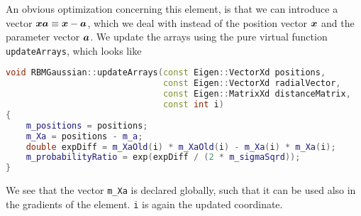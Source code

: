 An obvious optimization concerning this element, is that we can introduce a vector $\boldsymbol{{xa}}\equiv\boldsymbol{{x}}-\boldsymbol{{a}}$, which we deal with instead of the position vector $\boldsymbol{{x}}$ and the parameter vector $\boldsymbol{{a}}$. We update the arrays using the pure virtual function \lstinline|updateArrays|, which looks like
\begin{lstlisting}[language={c++},caption={Taken from \lstinline|rbmgaussian.cpp|.}]
void RBMGaussian::updateArrays(const Eigen::VectorXd positions,
							   const Eigen::VectorXd radialVector,
							   const Eigen::MatrixXd distanceMatrix,
							   const int i)
{
	m_positions = positions;
	m_Xa = positions - m_a;
	double expDiff = m_XaOld(i) * m_XaOld(i) - m_Xa(i) * m_Xa(i);
	m_probabilityRatio = exp(expDiff / (2 * m_sigmaSqrd));
}
\end{lstlisting}
We see that the vector \lstinline|m_Xa| is declared globally, such that it can be used also in the gradients of the element. \lstinline|i| is again the updated coordinate. 

